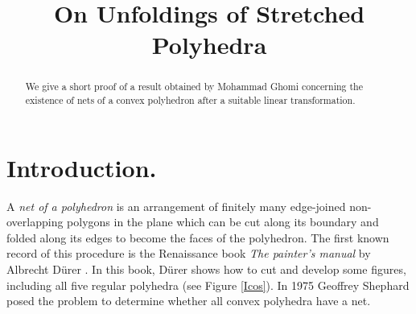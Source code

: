 \documentclass{article}
\theoremstyle{theorem}
\newcommand{\field}[1]{\ensuremath{\mathbb{#1}}}
\newcommand{\R}{\field{R}}
\begin{document}
\title{On Unfoldings of Stretched Polyhedra}
\author{}

\maketitle





\begin{abstract}
\noindent We give a short proof of a result obtained by Mohammad Ghomi concerning the existence of nets of a convex polyhedron after a suitable linear transformation.

\end{abstract}


\section*{Introduction.}


A \textit{net of a polyhedron} is an arrangement of finitely many edge-joined non-overlapping polygons in the plane which can be cut along its boundary and folded along its edges to become the faces of the polyhedron. The first known record of this procedure is the Renaissance book \textit{The painter's manual} by Albrecht D\"{u}rer \cite{Du}. In this book, D\"{u}rer shows how to cut and develop some figures, including all five regular polyhedra (see Figure \ref{Icos}).  In 1975 Geoffrey Shephard \cite{Sh} posed the problem to determine whether all convex polyhedra have a net.


\end{document}

